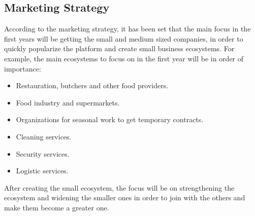 \subsection{Marketing Strategy}
According to the marketing strategy, it has been set that the main focus in the first years will be getting the small and medium sized companies, in order to quickly popularize the platform and create small business ecosystems. For example, the main ecosystems to focus on in the first year will be in order of importance:
\begin{itemize}
	\item Restauration, butchers and other food providers.
	\item Food industry and supermarkets.
	\item Organizations for seasonal work to get temporary contracts.
	\item Cleaning services.
	\item Security services.
	\item Logistic services.
\end{itemize}
After creating the small ecosystem, the focus will be on strengthening the ecosystem and widening the smaller ones in order to join with the others and make them become a greater one.
